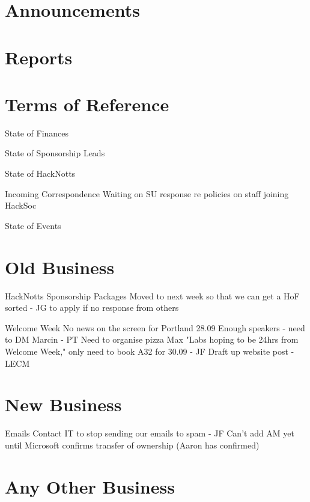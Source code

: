 \documentclass[11pt,hacksoc]{meetingmins}
\begin{document}
\maketitle

\section{Announcements}
\begin{items}
\item
\end{items}

\section{Reports}


\section{Terms of Reference}
\begin{items}
\item {State of Finances} 
\item {State of Sponsorship Leads}
\item {State of HackNotts}
\item {Incoming Correspondence}
  \subitem Waiting on SU response re policies on staff joining HackSoc
\item {State of Events}
\end{items}

\section{Old Business}
\begin{items}
\item {HackNotts}
   Sponsorship Packages
    \subsubitem Moved to next week so that we can get a HoF sorted - JG to apply if no response from others
\item {Welcome Week}
  \subitem No news on the screen for Portland 28.09
  \subitem Enough speakers - need to DM Marcin - PT
  \subitem Need to organise pizza 
  \subitem Max "Labs hoping to be 24hrs from Welcome Week," only need to book A32 for 30.09 - JF
  \subitem Draft up website post - LECM
\end{items}

\section{New Business}
\begin{items}
\item {Emails}
  \subitem Contact IT to stop sending our emails to spam - JF
  \subitem Can't add AM yet until Microsoft confirms transfer of ownership (Aaron has confirmed)
\end{items}

\section{Any Other Business}

\vspace{1em}
\nextmeeting{}
\end{document}
